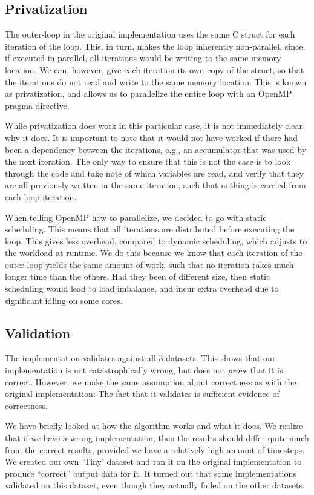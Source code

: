 \documentclass[11pt]{article}
\begin{document}
\subsection{Privatization}
The outer-loop in the original implementation uses the same C 
struct for each
iteration of the loop. This, in turn, makes the loop inherently non-parallel, since,
if executed in parallel, all iterations would be writing to the same memory location. 
We can, however, give each iteration its own copy of the
struct, so that the iterations do not read and write to the same memory location. This is 
known as privatization, and allows us to parallelize the entire loop
with an OpenMP pragma directive. 

While privatization does work in this particular case, it is not immediately clear why it does. It is
important to note that it would not have worked if there had been a dependency between the iterations,
e.g., an accumulator that was used by the next iteration. The only way to ensure
that this is not the case is to look through the code and take note of which 
variables are read, and verify that they are all previously written in the 
same iteration, such that nothing is carried from each loop iteration.

When telling OpenMP how to parallelize, we decided to go with static scheduling.
This means that all iterations are distributed before executing the loop. This gives
less overhead, compared to dynamic scheduling, which adjusts to the workload at runtime. We do
this because we know that each iteration of the outer loop yields the same
amount of work, such that no iteration takes much longer time than the others.
Had they been of different size, then static scheduling would lead to load 
imbalance, and incur extra overhead due to significant idling on some cores.


\subsection{Validation}
The implementation validates against all 3 datasets. This shows that our
implementation is not catastrophically wrong, but does not \emph{prove} that it is
correct. However, we make the same assumption about correctness as with the 
original implementation: The fact that it validates is sufficient evidence of correctness.

We have briefly looked at how the algorithm works and what it does. We
realize that if we have a wrong implementation, then the results should differ quite much from the correct results, provided we have a relatively high amount of timesteps. We created our own 'Tiny' dataset and ran it on the original implementation to produce ``correct'' output data for it. It turned out that some implementations validated on this dataset, even though they actually failed on the other datasets.
\end{document}
